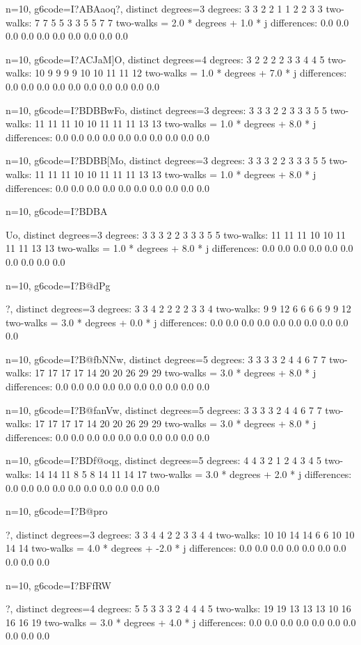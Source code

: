 {{{{{{{{n=10, g6code=I?ABAaoq?, distinct degrees=3
degrees: 3 3 2 2 1 1 2 2 3 3 
two-walks: 7 7 5 5 3 3 5 5 7 7 
two-walks = 2.0 * degrees + 1.0 * j
differences: 0.0 0.0 0.0 0.0 0.0 0.0 0.0 0.0 0.0 0.0 

n=10, g6code=I?ACJaM]O, distinct degrees=4
degrees: 3 2 2 2 2 3 3 4 4 5 
two-walks: 10 9 9 9 9 10 10 11 11 12 
two-walks = 1.0 * degrees + 7.0 * j
differences: 0.0 0.0 0.0 0.0 0.0 0.0 0.0 0.0 0.0 0.0 

n=10, g6code=I?BDBBwFo, distinct degrees=3
degrees: 3 3 3 2 2 3 3 3 5 5 
two-walks: 11 11 11 10 10 11 11 11 13 13 
two-walks = 1.0 * degrees + 8.0 * j
differences: 0.0 0.0 0.0 0.0 0.0 0.0 0.0 0.0 0.0 0.0 

n=10, g6code=I?BDBB[Mo, distinct degrees=3
degrees: 3 3 3 2 2 3 3 3 5 5 
two-walks: 11 11 11 10 10 11 11 11 13 13 
two-walks = 1.0 * degrees + 8.0 * j
differences: 0.0 0.0 0.0 0.0 0.0 0.0 0.0 0.0 0.0 0.0 

n=10, g6code=I?BDBA{Uo, distinct degrees=3
degrees: 3 3 3 2 2 3 3 3 5 5 
two-walks: 11 11 11 10 10 11 11 11 13 13 
two-walks = 1.0 * degrees + 8.0 * j
differences: 0.0 0.0 0.0 0.0 0.0 0.0 0.0 0.0 0.0 0.0 

n=10, g6code=I?B@dPg{?, distinct degrees=3
degrees: 3 3 4 2 2 2 2 3 3 4 
two-walks: 9 9 12 6 6 6 6 9 9 12 
two-walks = 3.0 * degrees + 0.0 * j
differences: 0.0 0.0 0.0 0.0 0.0 0.0 0.0 0.0 0.0 0.0 

n=10, g6code=I?B@fbNNw, distinct degrees=5
degrees: 3 3 3 3 2 4 4 6 7 7 
two-walks: 17 17 17 17 14 20 20 26 29 29 
two-walks = 3.0 * degrees + 8.0 * j
differences: 0.0 0.0 0.0 0.0 0.0 0.0 0.0 0.0 0.0 0.0 

n=10, g6code=I?B@fanVw, distinct degrees=5
degrees: 3 3 3 3 2 4 4 6 7 7 
two-walks: 17 17 17 17 14 20 20 26 29 29 
two-walks = 3.0 * degrees + 8.0 * j
differences: 0.0 0.0 0.0 0.0 0.0 0.0 0.0 0.0 0.0 0.0 

n=10, g6code=I?BDf@oqg, distinct degrees=5
degrees: 4 4 3 2 1 2 4 3 4 5 
two-walks: 14 14 11 8 5 8 14 11 14 17 
two-walks = 3.0 * degrees + 2.0 * j
differences: 0.0 0.0 0.0 0.0 0.0 0.0 0.0 0.0 0.0 0.0 

n=10, g6code=I?B@pro{?, distinct degrees=3
degrees: 3 3 4 4 2 2 3 3 4 4 
two-walks: 10 10 14 14 6 6 10 10 14 14 
two-walks = 4.0 * degrees + -2.0 * j
differences: 0.0 0.0 0.0 0.0 0.0 0.0 0.0 0.0 0.0 0.0 

n=10, g6code=I?BFfRW}?, distinct degrees=4
degrees: 5 5 3 3 3 2 4 4 4 5 
two-walks: 19 19 13 13 13 10 16 16 16 19 
two-walks = 3.0 * degrees + 4.0 * j
differences: 0.0 0.0 0.0 0.0 0.0 0.0 0.0 0.0 0.0 0.0 

}}}}}}}}}}
